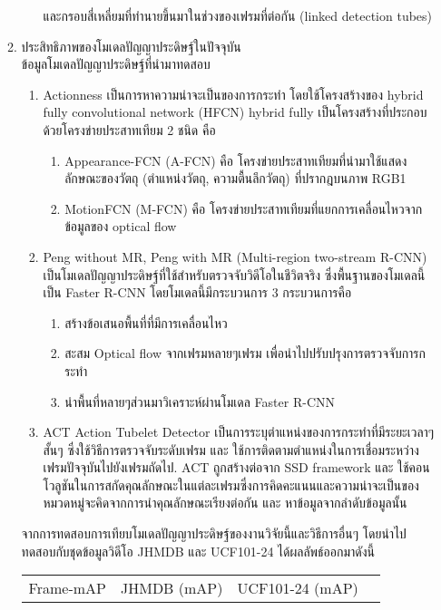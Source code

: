 \begin{enumerate}
\begin{enumerate}
\begin{enumerate}
			และกรอบสี่เหลี่ยมที่ทำนายขึ้นมาในช่วงของเฟรมที่ต่อกัน (linked detection tubes) 
		\end{enumerate}
		\item ประสิทธิภาพของโมเดลปัญญาประดิษฐ์ในปัจจุบัน
		\\ข้อมูลโมเดลปัญญาประดิษฐ์ที่นำมาทดสอบ
		\begin{enumerate}				
			\item Actionness\textsuperscript{\cite{actioness}} เป็นการหาความน่าจะเป็นของการกระทำ โดยใช้โครงสร้างของ hybrid fully convolutional network (HFCN) hybrid fully เป็นโครงสร้างที่ประกอบด้วยโครงข่ายประสาทเทียม 2 ชนิด คือ
			\begin{enumerate}
				\item Appearance-FCN (A-FCN) คือ โครงข่ายประสาทเทียมที่นำมาใช้แสดงลักษณะของวัตถุ (ตำแหน่งวัตถุ, ความตื้นลึกวัตถุ) ที่ปรากฎบนภาพ RGB1
				\item MotionFCN (M-FCN) คือ โครงข่ายประสาทเทียมที่แยกการเคลื่อนไหวจากข้อมูลของ optical flow
			 \end{enumerate}
			\item Peng without MR, Peng with MR (Multi-region two-stream R-CNN)\textsuperscript{\cite{peng}} เป็นโมเดลปัญญาประดิษฐ์ที่ใช้สำหรับตรวจจับวิดีโอในชีวิตจริง ซึ่งพื้นฐานของโมเดลนี้เป็น Faster R-CNN โดยโมเดลนี้มีกระบวนการ 3 กระบวนการคือ
			\begin{enumerate}
					\item สร้างข้อเสนอพื้นที่ที่มีการเคลื่อนไหว
					\item สะสม Optical flow จากเฟรมหลายๆเฟรม เพื่อนำไปปรับปรุงการตรวจจับการกระทำ
					\item นำพื้นที่หลายๆส่วนมาวิเคราะห์ผ่านโมเดล Faster R-CNN
			\end{enumerate}
			\item ACT Action Tubelet Detector\textsuperscript{\cite{act}} เป็นการระบุตำแหน่งของการกระทำที่มีระยะเวลาๆสั้นๆ ซึ่งใช้วิธีการตรวจจับระดับเฟรม และ ใช้การติดตามตำแหน่งในการเชื่อมระหว่างเฟรมปัจจุบันไปยังเฟรมถัดไป. ACT ถูกสร้างต่อจาก SSD framework และ ใช้คอนโวลูชันในการสกัดคุณลักษณะในแต่ละเฟรมซึ่งการคิดคะแนนและความน่าจะเป็นของหมวดหมู่จะคิดจากการนำคุณลักษณะเรียงต่อกัน และ หาข้อมูลจากลำดับข้อมูลนั้น
		\end{enumerate}
		จากการทดสอบการเทียบโมเดลปัญญาประดิษฐ์ของงานวิจัยนี้และวิธีการอื่นๆ โดยนำไปทดสอบกับชุดข้อมูลวิดีโอ JHMDB และ UCF101-24 ได้ผลลัพธ์ออกมาดังนี้
			\begin{table}[!ht]
				\centering
				\begin{tabular}{|c|c|c|c|}
					\hline
					{Frame-mAP}&{JHMDB (mAP)}&{UCF101-24 (mAP)}								\\

\end{tabular}
\end{table}
\end{enumerate}
\end{enumerate}
